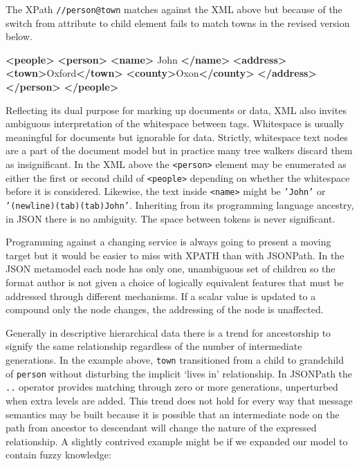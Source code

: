 \documentclass[12pt, ]{article}
\newenvironment{Shaded}{}{}
\newcommand{\KeywordTok}[1]{\textcolor[rgb]{0.00,0.44,0.13}{\textbf{{#1}}}}
\newcommand{\NormalTok}[1]{{#1}}
\begin{document}
The XPath \texttt{//person@town} matches against the XML above but
because of the switch from attribute to child element fails to match
towns in the revised version below.

\begin{Shaded}
\begin{Highlighting}[]
\KeywordTok{<people>}
   \KeywordTok{<person>}
      \KeywordTok{<name>}
         \NormalTok{John}
      \KeywordTok{</name>}
      \KeywordTok{<address>}
         \KeywordTok{<town>}\NormalTok{Oxford}\KeywordTok{</town>} \KeywordTok{<county>}\NormalTok{Oxon}\KeywordTok{</county>}
      \KeywordTok{</address>}
   \KeywordTok{</person>}
\KeywordTok{</people>}
\end{Highlighting}
\end{Shaded}

Reflecting its dual purpose for marking up documents or data, XML also
invites ambiguous interpretation of the whitespace between tags.
Whitespace is usually meaningful for documents but ignorable for data.
Strictly, whitespace text nodes are a part of the document model but in
practice many tree walkers discard them as insignificant. In the XML
above the \texttt{\textless{}person\textgreater{}} element may be
enumerated as either the first or second child of
\texttt{\textless{}people\textgreater{}} depending on whether the
whitespace before it is considered. Likewise, the text inside
\texttt{\textless{}name\textgreater{}} might be \texttt{'John'} or
\texttt{'(newline)(tab)(tab)John'}. Inheriting from its programming
language ancestry, in JSON there is no ambiguity. The space between
tokens is never significant.

Programming against a changing service is always going to present a
moving target but it would be easier to miss with XPATH than with
JSONPath. In the JSON metamodel each node has only one, unambiguous set
of children so the format author is not given a choice of logically
equivalent features that must be addressed through different mechanisms.
If a scalar value is updated to a compound only the node changes, the
addressing of the node is unaffected.

Generally in descriptive hierarchical data there is a trend for
ancestorship to signify the same relationship regardless of the number
of intermediate generations. In the example above, \texttt{town}
transitioned from a child to grandchild of \texttt{person} without
disturbing the implicit `lives in' relationship. In JSONPath the
\texttt{..} operator provides matching through zero or more generations,
unperturbed when extra levels are added. This trend does not hold for
every way that message semantics may be built because it is possible
that an intermediate node on the path from ancestor to descendant will
change the nature of the expressed relationship. A slightly contrived
example might be if we expanded our model to contain fuzzy knowledge:
\end{document}
